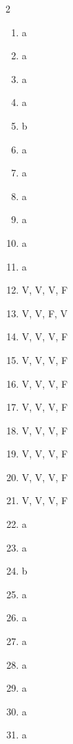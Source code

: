 \documentclass[12pt,a4paper]{article}
\begin{document}
\begin{multicols}{2}
\begin{enumerate}[label=\textbf{Q\arabic*.}]
    \item a
    \item a
    \item a
    \item a
    \item b
    \item a
    \item a
    \item a
    \item a
    \item a
    \item a
    \item V, V, V, F
    \item V, V, F, V
    \item V, V, V, F
    \item V, V, V, F
    \item V, V, V, F
    \item V, V, V, F
    \item V, V, V, F
    \item V, V, V, F
    \item V, V, V, F
    \item V, V, V, F
    \item a
    \item a
    \item b
    \item a
    \item a
    \item a
    \item a
    \item a
    \item a
    \item a
\end{enumerate}
\end{multicols}
\end{document}
